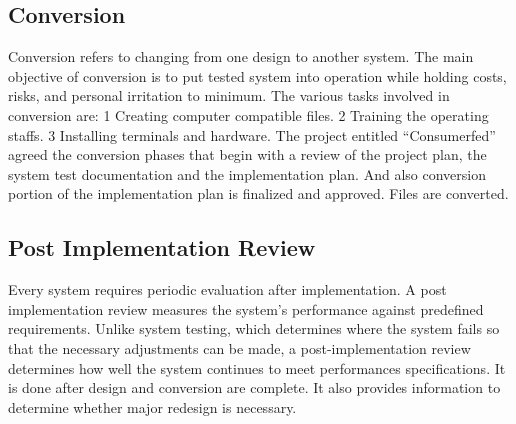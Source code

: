 \documentclass[a4paper,12pt]{article}
\begin{document}
\subsection{Conversion}  
\hspace{5mm}  
Conversion refers to changing from one design to another system. The main objective of conversion is to put tested system into operation while holding costs, risks, and personal irritation to minimum. The various tasks involved in conversion are:
1	Creating computer compatible files.
2	Training the operating staffs.
3	Installing terminals and hardware.
The project entitled “Consumerfed” agreed the conversion phases that begin with a review of the project plan, the system test documentation and the implementation plan. And also conversion portion of the implementation plan is finalized and approved.  Files are converted.
\newpage
\subsection{Post Implementation Review}  
\hspace{5mm}
 Every system requires periodic evaluation after implementation. A post implementation review measures the system’s performance against predefined requirements. Unlike system testing, which determines where the system fails so that the necessary adjustments can be made, a post-implementation review determines how well the system continues to meet performances specifications. It is done after design and conversion are complete. It also provides information to determine whether major redesign is necessary. 
\newpage
\end{document}
